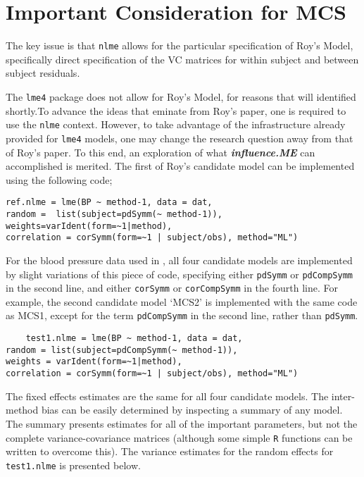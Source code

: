 \documentclass[12pt, a4paper]{report}
\theoremstyle{plain}
\theoremstyle{definition}
\theoremstyle{remark}
\begin{document}
\section{Important Consideration for MCS}

The key issue is that \texttt{nlme} allows for the particular specification of Roy's Model, specifically direct specification of the VC matrices for within subject and between subject residuals.

The \texttt{lme4} package does not allow for Roy's Model, for reasons that will identified shortly.To advance the ideas that eminate from Roy's paper, one is required to use the \texttt{nlme} context. However, to take advantage of the infrastructure already provided for \texttt{lme4} models, one may change the research question away from that of Roy's paper. To this end, an exploration of what \textbf{\textit{influence.ME}} can accomplished is merited. The first of Roy's candidate model can be implemented using the following code;\\

\begin{framed}
\begin{verbatim}
ref.nlme = lme(BP ~ method-1, data = dat,
random =  list(subject=pdSymm(~ method-1)),
weights=varIdent(form=~1|method),
correlation = corSymm(form=~1 | subject/obs), method="ML")
\end{verbatim}
\end{framed}

For the blood pressure data used in \citet{ARoy2009}, all four candidate models are implemented by slight variations of this piece of code, specifying either \texttt{pdSymm} or \texttt{pdCompSymm} in the second line, and either \texttt{corSymm} or \texttt{corCompSymm} in the fourth line.
For example, the second candidate model `MCS2' is implemented with the same code as MCS1, except for the term \texttt{pdCompSymm} in the second line, rather than \texttt{pdSymm}.

\begin{framed}
\begin{verbatim}
    test1.nlme = lme(BP ~ method-1, data = dat,
random = list(subject=pdCompSymm(~ method-1)),
weights = varIdent(form=~1|method),
correlation = corSymm(form=~1 | subject/obs), method="ML")
\end{verbatim}
\end{framed}

The fixed effects estimates are the same for all four candidate models. The inter-method bias can be easily determined by inspecting a summary of any model. The summary presents estimates for all of the important parameters, but not the complete variance-covariance matrices (although some simple \texttt{R} functions can be written to overcome this). The variance estimates for the random effects for \texttt{test1.nlme} is presented below.
\end{document}
